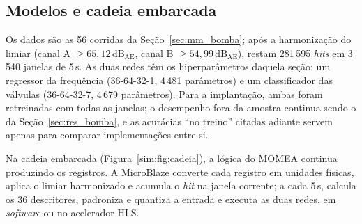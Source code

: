 \subsection{Modelos e cadeia embarcada}
\label{sim:sec:sistema}

Os dados são as 56 corridas da Seção~\ref{sec:mm_bomba}; após a harmonização do limiar (canal A \(\ge 65{,}12\,\mathrm{dB_{AE}}\), canal B \(\ge 54{,}99\,\mathrm{dB_{AE}}\)), restam 281\,595 \textit{hits} em 3\,540 janelas de 5\,s. As duas redes têm os hiperparâmetros daquela seção: um regressor da frequência (36-64-32-1, 4\,481 parâmetros) e um classificador das válvulas (36-64-32-7, 4\,679 parâmetros). Para a implantação, ambas foram retreinadas com todas as janelas; o desempenho fora da amostra continua sendo o da Seção~\ref{sec:res_bomba}, e as acurácias ``no treino'' citadas adiante servem apenas para comparar implementações entre si.

Na cadeia embarcada (Figura~\ref{sim:fig:cadeia}), a lógica do MOMEA continua produzindo os registros. A MicroBlaze converte cada registro em unidades físicas, aplica o limiar harmonizado e acumula o \textit{hit} na janela corrente; a cada 5\,s, calcula os 36 descritores, padroniza e quantiza a entrada e executa as duas redes, em \textit{software} ou no acelerador HLS.

